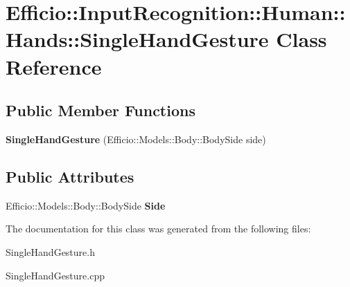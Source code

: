 \hypertarget{class_efficio_1_1_input_recognition_1_1_human_1_1_hands_1_1_single_hand_gesture}{}\section{Efficio\+:\+:Input\+Recognition\+:\+:Human\+:\+:Hands\+:\+:Single\+Hand\+Gesture Class Reference}
\label{class_efficio_1_1_input_recognition_1_1_human_1_1_hands_1_1_single_hand_gesture}
\subsection*{Public Member Functions}
\begin{DoxyCompactItemize}
\item 
{\bfseries Single\+Hand\+Gesture} (Efficio\+::\+Models\+::\+Body\+::\+Body\+Side side)\hypertarget{class_efficio_1_1_input_recognition_1_1_human_1_1_hands_1_1_single_hand_gesture_a9272b7c66f22f4df17d6e4415214602d}{}\label{class_efficio_1_1_input_recognition_1_1_human_1_1_hands_1_1_single_hand_gesture_a9272b7c66f22f4df17d6e4415214602d}

\end{DoxyCompactItemize}
\subsection*{Public Attributes}
\begin{DoxyCompactItemize}
\item 
Efficio\+::\+Models\+::\+Body\+::\+Body\+Side {\bfseries Side}\hypertarget{class_efficio_1_1_input_recognition_1_1_human_1_1_hands_1_1_single_hand_gesture_a131155f40e99e412ffe1063c0c188dda}{}\label{class_efficio_1_1_input_recognition_1_1_human_1_1_hands_1_1_single_hand_gesture_a131155f40e99e412ffe1063c0c188dda}

\end{DoxyCompactItemize}


The documentation for this class was generated from the following files\+:\begin{DoxyCompactItemize}
\item 
Single\+Hand\+Gesture.\+h\item 
Single\+Hand\+Gesture.\+cpp\end{DoxyCompactItemize}

